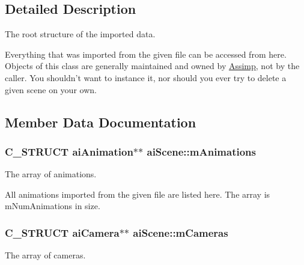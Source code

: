 \subsection{Detailed Description}
The root structure of the imported data.

Everything that was imported from the given file can be accessed from here. Objects of this class are generally maintained and owned by \hyperlink{namespace_assimp}{Assimp}, not by the caller. You shouldn't want to instance it, nor should you ever try to delete a given scene on your own. 

\subsection{Member Data Documentation}
\hypertarget{structai_scene_ab76fb8f38c2e7365ccce42d565b62b25}{
\subsubsection[{m\-Animations}]{\setlength{\rightskip}{0pt plus 5cm}C\-\_\-\-S\-T\-R\-U\-C\-T {\bf ai\-Animation}$\ast$$\ast$ ai\-Scene\-::m\-Animations}}\label{structai_scene_ab76fb8f38c2e7365ccce42d565b62b25}
The array of animations.

All animations imported from the given file are listed here. The array is m\-Num\-Animations in size. \hypertarget{structai_scene_a71e7d204d96969ca4f5a931f4d636f1e}{
\subsubsection[{m\-Cameras}]{\setlength{\rightskip}{0pt plus 5cm}C\-\_\-\-S\-T\-R\-U\-C\-T {\bf ai\-Camera}$\ast$$\ast$ ai\-Scene\-::m\-Cameras}}\label{structai_scene_a71e7d204d96969ca4f5a931f4d636f1e}
The array of cameras.

